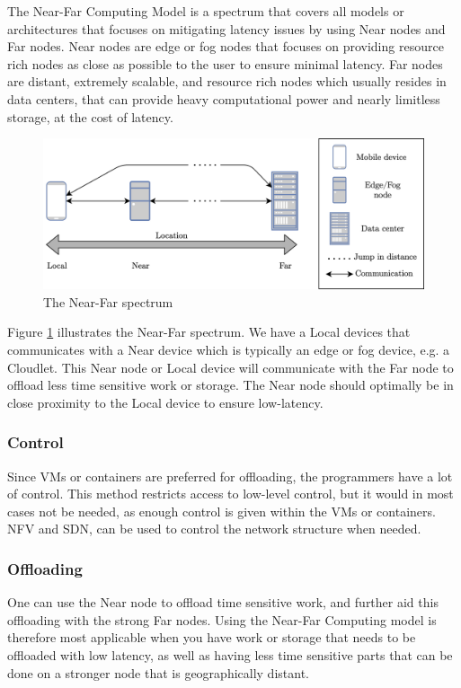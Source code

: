 The Near-Far Computing Model is a spectrum that covers all models or architectures that focuses on mitigating latency issues by using Near nodes and Far nodes. Near nodes are edge or fog nodes that focuses on providing resource rich nodes as close as possible to the user to ensure minimal latency. Far nodes are distant, extremely scalable, and resource rich nodes which usually resides in data centers, that can provide heavy computational power and nearly limitless storage, at the cost of latency.

\begin{figure}[t]
    \centering
    \includegraphics[scale=1]{chapters/6_evaluation/figures/near-far_diagram.png}
    \caption{The Near-Far spectrum}
    \label{fig:nearFarSimple}
\end{figure}


Figure \ref{fig:nearFarSimple} illustrates the Near-Far spectrum. We have a Local devices that communicates with a Near device which is typically an edge or fog device, e.g. a Cloudlet. This Near node or Local device will communicate with the Far node to offload less time sensitive work or storage. The Near node should optimally be in close proximity to the Local device to ensure low-latency.

\subsubsection{Control}
Since VMs or containers are preferred for offloading, the programmers have a lot of control. This method restricts access to low-level control, but it would in most cases not be needed, as enough control is given within the VMs or containers. NFV and SDN, can be used to control the network structure when needed.

\subsubsection{Offloading}
One can use the Near node to offload time sensitive work, and further aid this offloading with the strong Far nodes. Using the Near-Far Computing model is therefore most applicable when you have work or storage that needs to be offloaded with low latency, as well as having less time sensitive parts that can be done on a stronger node that is geographically distant. 

